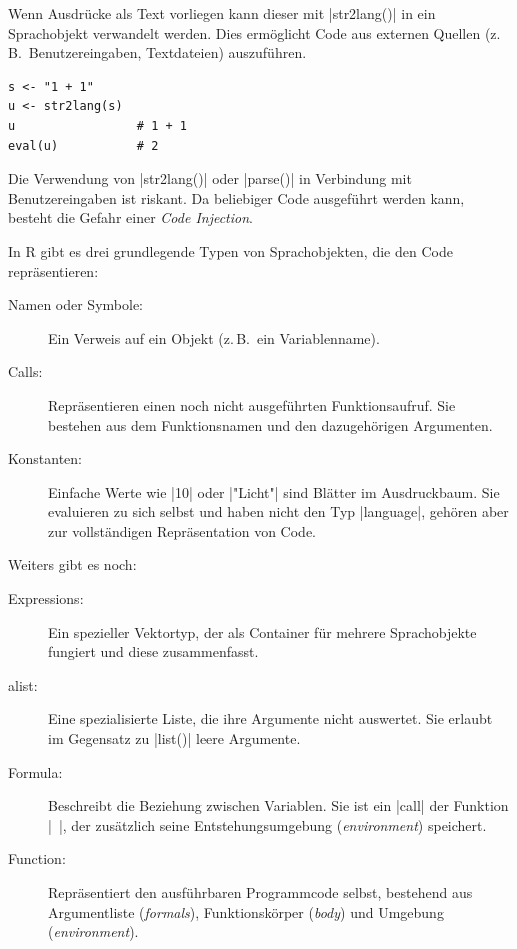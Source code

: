 \documentclass[10pt,twocolumn]{scrartcl}
\renewcommand{\lstinline}{\mycoloredinline}
\begin{document}
Wenn Ausdrücke als Text vorliegen kann dieser mit \lstinline|str2lang()| in ein Sprachobjekt verwandelt werden. Dies ermöglicht Code aus externen Quellen (z.\,B.\ Benutzereingaben, Textdateien) auszuführen.

\begin{lstlisting}
s <- "1 + 1" 
u <- str2lang(s)
u                 # 1 + 1
eval(u)           # 2
\end{lstlisting}

Die Verwendung von \lstinline|str2lang()| oder \lstinline|parse()| in Verbindung mit Benutzereingaben ist riskant. Da beliebiger Code ausgeführt werden kann, besteht die Gefahr einer \emph{Code Injection}.

In R gibt es drei grundlegende Typen von Sprachobjekten, die den Code repräsentieren:

\begin{description}
\item[Namen oder Symbole:] Ein Verweis auf ein Objekt (z.\,B.\ ein Variablenname).
\item[Calls:] Repräsentieren einen noch nicht ausgeführten Funktionsaufruf. Sie bestehen aus dem Funktionsnamen und den dazugehörigen Argumenten.
\item[Konstanten:] Einfache Werte wie \lstinline|10| oder \lstinline|"Licht"| sind Blätter im Ausdruckbaum. Sie evaluieren zu sich selbst und haben nicht den Typ \lstinline|language|, gehören aber zur vollständigen Repräsentation von Code.
\end{description}

Weiters gibt es noch:

\begin{description}
\item[Expressions:] Ein spezieller Vektortyp, der als Container für mehrere Sprachobjekte fungiert und diese zusammenfasst.
\item[alist:] Eine spezialisierte Liste, die ihre Argumente nicht auswertet. Sie erlaubt im Gegensatz zu \lstinline|list()| leere Argumente.
\item[Formula:] Beschreibt die Beziehung zwischen Variablen. Sie ist ein \lstinline|call| der Funktion \lstinline|~|, der zusätzlich seine Entstehungsumgebung (\emph{environment}) speichert.
\item[Function:] Repräsentiert den ausführbaren Programmcode selbst, bestehend aus Argumentliste (\emph{formals}), Funktionskörper (\emph{body}) und Umgebung (\emph{environment}).
\end{description}
\end{document}
